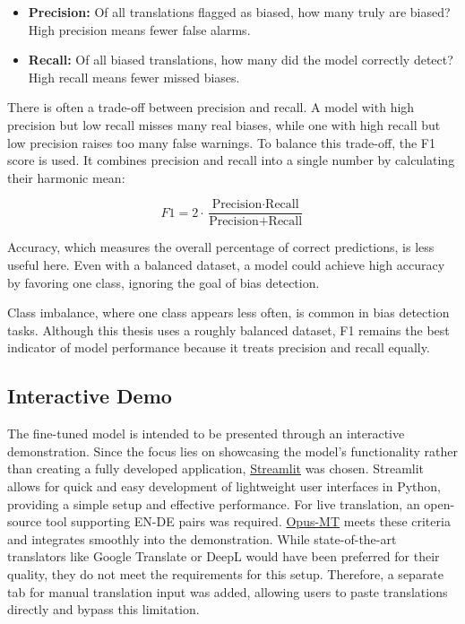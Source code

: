 \begin{itemize}
    \item \textbf{Precision:} Of all translations flagged as biased, how many truly are biased? High precision means fewer false alarms.
    \item \textbf{Recall:} Of all biased translations, how many did the model correctly detect? High recall means fewer missed biases.
\end{itemize}

There is often a trade-off between precision and recall. A model with high precision but low recall misses many real biases, while one with high recall but low precision raises too many false warnings. To balance this trade-off, the F1 score is used. It combines precision and recall into a single number by calculating their harmonic mean:

\[
F1 = 2 \cdot \frac{\text{Precision} \cdot \text{Recall}}{\text{Precision} + \text{Recall}}
\]
\vspace{0.5em}

Accuracy, which measures the overall percentage of correct predictions, is less useful here. Even with a balanced dataset, a model could achieve high accuracy by favoring one class, ignoring the goal of bias detection.

Class imbalance, where one class appears less often, is common in bias detection tasks. Although this thesis uses a roughly balanced dataset, F1 remains the best indicator of model performance because it treats precision and recall equally.

\subsection{Interactive Demo}
    The fine-tuned model is intended to be presented through an interactive demonstration. Since the focus lies on showcasing the model’s functionality rather than creating a fully developed application, \href{https://streamlit.io/}{Streamlit} was chosen. Streamlit allows for quick and easy development of lightweight user interfaces in Python, providing a simple setup and effective performance. For live translation, an open-source tool supporting EN-DE pairs was required. \href{https://github.com/Helsinki-NLP/Opus-MT}{Opus-MT} \parencite{tiedemannOPUSMTBuildingOpen2020} meets these criteria and integrates smoothly into the demonstration. While state-of-the-art translators like Google Translate or DeepL would have been preferred for their quality, they do not meet the requirements for this setup. Therefore, a separate tab for manual translation input was added, allowing users to paste translations directly and bypass this limitation.
